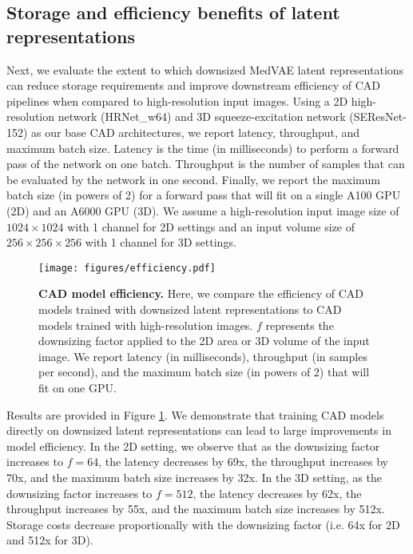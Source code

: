 \subsection{Storage and efficiency benefits of latent representations}

Next, we evaluate the extent to which downsized MedVAE latent representations can reduce storage requirements and improve downstream efficiency of CAD pipelines when compared to high-resolution input images. Using a 2D high-resolution network (HRNet\_w64) and 3D squeeze-excitation network (SEResNet-152) as our base CAD architectures, we report latency, throughput, and maximum batch size. Latency is the time (in milliseconds) to perform a forward pass of the network on one batch. Throughput is the number of samples that can be evaluated by the network in one second. Finally, we report the maximum batch size (in powers of 2) for a forward pass that will fit on a single A100 GPU (2D) and an A6000 GPU (3D). We assume a high-resolution input image size of $1024 \times 1024$ with 1 channel for 2D settings and an input volume size of $256 \times 256 \times 256$ with 1 channel for 3D settings.

\begin{figure}[ht]
\centering
\texttt{[image: figures/efficiency.pdf]}
\caption{\textbf{CAD model efficiency.} Here, we compare the efficiency of CAD models trained with downsized latent representations to CAD models trained with high-resolution images. $f$ represents the downsizing factor applied to the 2D area or 3D volume of the input image. We report latency (in milliseconds), throughput (in samples per second), and the maximum batch size (in powers of 2) that will fit on one GPU.}
\label{fig:efficiency}
\end{figure}

Results are provided in Figure \ref{fig:efficiency}. We demonstrate that training CAD models directly on downsized latent representations can lead to large improvements in model efficiency. In the 2D setting, we observe that as the downsizing factor increases to $f=64$, the latency decreases by 69x, the throughput increases by 70x, and the maximum batch size increases by 32x. In the 3D setting, as the downsizing factor increases to $f=512$, the latency decreases by 62x, the throughput increases by 55x, and the maximum batch size increases by 512x. Storage costs decrease proportionally with the downsizing factor (i.e. 64x for 2D and 512x for 3D).

